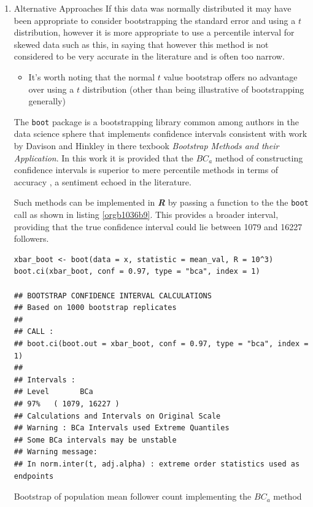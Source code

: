 \documentclass[11pt]{article}
\begin{document}
\begin{enumerate}
\item Alternative Approaches
\label{sec:orgb9c3944}
If this data was normally distributed it may have been appropriate to consider
bootstrapping the standard error and using a \(t\) distribution, however it is more appropriate to use a
percentile interval for skewed data such as this, in saying that however this method is not considered to be very accurate in the literature and is often too narrow. \cite[Section 4.1]{hesterberg2015}

\begin{itemize}
\item It's worth noting that the normal \(t\) value bootstrap offers no advantage over
using a \(t\) distribution (other than being illustrative of bootstrapping
generally) \cite[Section 4.1]{hesterberg2015}
\end{itemize}


 The \texttt{boot} package is a bootstrapping library common among authors in the data science sphere
 \cite[p. 295]{james2013} \cite[p. 237]{wiley2019} that implements
 confidence intervals consistent with work by Davison and Hinkley
 \cite{ripley2020} in there texbook \emph{Bootstrap Methods and their Application}.
In this work it is provided that the \(BC_{a}\) method of constructing confidence
 intervals is  superior to mere percentile
 methods in terms of accuracy \cite[Ch. 5]{davison1997}, a sentiment echoed in the literature. \cite[Ch. 5]{carpenter2000,davison1997}

Such methods can be implemented in \textbf{\emph{R}} by passing a function to the the \texttt{boot} call as shown in listing \ref{orgb1036b9}. This provides a broader interval, providing that the true confidence interval could lie between 1079 and 16227 followers.

\begin{listing}[htbp]
\begin{verbatim}
xbar_boot <- boot(data = x, statistic = mean_val, R = 10^3)
boot.ci(xbar_boot, conf = 0.97, type = "bca", index = 1)

## BOOTSTRAP CONFIDENCE INTERVAL CALCULATIONS
## Based on 1000 bootstrap replicates
##
## CALL :
## boot.ci(boot.out = xbar_boot, conf = 0.97, type = "bca", index = 1)
##
## Intervals :
## Level       BCa
## 97%   ( 1079, 16227 )
## Calculations and Intervals on Original Scale
## Warning : BCa Intervals used Extreme Quantiles
## Some BCa intervals may be unstable
## Warning message:
## In norm.inter(t, adj.alpha) : extreme order statistics used as endpoints
\end{verbatim}
\caption{\label{orgb1036b9}Bootstrap of population mean follower count implementing the \(BC_{a}\) method}
\end{listing}
\end{enumerate}
\end{document}
